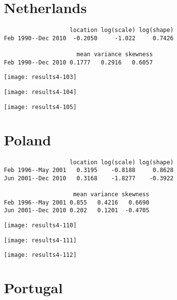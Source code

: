 \documentclass[a4paper]{article}
\begin{document}
\newpage

\section*{Netherlands}


\begin{verbatim}
                   location log(scale) log(shape)
Feb 1990--Dec 2010  -0.2050     -1.022     0.7426

                     mean variance skewness
Feb 1990--Dec 2010 0.1777   0.2916   0.6057

\end{verbatim}

\begin{center}
\texttt{[image: results4-103]}

\texttt{[image: results4-104]}

\texttt{[image: results4-105]}
\end{center}


\newpage

\section*{Poland}


\begin{verbatim}
                   location log(scale) log(shape)
Feb 1996--May 2001   0.3195    -0.8188     0.8628
Jun 2001--Dec 2010   0.3168    -1.8277    -0.3922

                    mean variance skewness
Feb 1996--May 2001 0.855   0.4216   0.6690
Jun 2001--Dec 2010 0.202   0.1201  -0.4705

\end{verbatim}

\begin{center}
\texttt{[image: results4-110]}

\texttt{[image: results4-111]}

\texttt{[image: results4-112]}
\end{center}


\newpage

\section*{Portugal}
\end{document}
